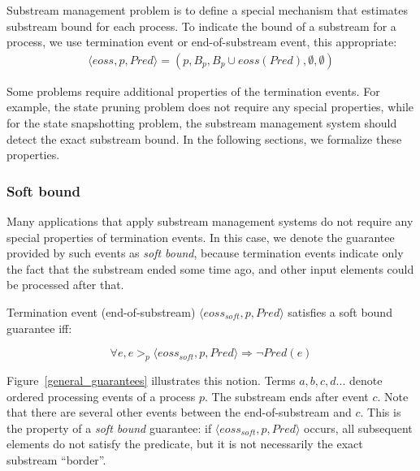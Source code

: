 \begin{definition}
Substream management problem is to define a special mechanism that estimates substream bound for each process. To indicate the bound of a substream for a process, we use termination event or end-of-substream event, this appropriate:
\begin{multline}
  \langle eoss, p, Pred \rangle = (p, B_p, B_p\cup eoss(Pred), \emptyset, \emptyset)  
\end{multline}
\end{definition}

Some problems require additional properties of the termination events. For example, the state pruning problem does not require any special properties, while for the state snapshotting problem, the substream management system should detect the exact substream bound. In the following sections, we formalize these properties. 

\subsubsection{Soft bound}

Many applications that apply substream management systems do not require any special properties of termination events. In this case, we denote the guarantee provided by such events as {\em soft bound}, because termination events indicate only the fact that the substream ended some time ago, and other input elements could be processed after that.

\begin{definition}
Termination event (end-of-substream) $\langle eoss_{soft}, p, Pred\rangle$ satisfies a soft bound guarantee iff:

\begin{equation}
\forall e, e >_p \langle eoss_{soft}, p, Pred\rangle \Rightarrow \neg Pred(e)
\end{equation}
\end{definition}

Figure~\ref{general_guarantees} illustrates this notion. Terms $a,b,c,d...$ denote ordered processing events of a process $p$. The substream ends after event $c$. Note that there are several other events between the end-of-substream and $c$. This is the property of a {\em soft bound} guarantee: if $\langle eoss_{soft}, p, Pred\rangle$ occurs, all subsequent elements do not satisfy the predicate, but it is not necessarily the exact substream ``border''.

